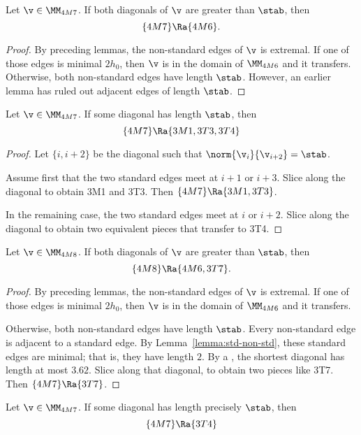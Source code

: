 \begin{lemma}[]
Let $\v\in \MM_{4M7}$.  If both diagonals of $\v$ are greater than $\stab$, then
\[
\{4M7\}\Ra \{4M6\}.
\]
\end{lemma}

\begin{proof}
By preceding lemmas, the non-standard edges of $\v$ is extremal.  If one of those
edges is minimal $2h_0$, then $\v$ is in the domain of $\MM_{4M6}$ and it transfers.
Otherwise, both non-standard edges have length $\stab$.  However, an
earlier lemma has ruled out adjacent edges of length $\stab$.
\end{proof}

\begin{lemma}[]
Let $\v\in \MM_{4M7}$.  If some diagonal has length $\stab$, then
\[
\{4M7\}\Ra \{3M1,3T3,3T4\}
\]
\end{lemma}

\begin{proof} Let $\{i,i+2\}$ be the diagonal such that $\norm{\v_i}{\v_{i+2}} = \stab$.

Assume first that the two standard edges meet at $i+1$ or $i+3$.
Slice along the diagonal to obtain 3M1 and 3T3.  Then $\{4M7\}\Ra\{3M1,3T3\}$.

In the remaining case, the two standard edges meet at $i$ or $i+2$.
Slice along the diagonal to obtain two equivalent pieces that transfer to 3T4.
\end{proof}

\begin{lemma}[]
Let $\v\in \MM_{4M8}$.  If both diagonals of $\v$ are greater than $\stab$, then
\[
\{4M8\}\Ra \{4M6,3T7\}.
\]
\end{lemma}

\begin{proof}
By preceding lemmas, the non-standard edges of $\v$ is extremal.  If one of those
edges is minimal $2h_0$, then $\v$ is in the domain of $\MM_{4M6}$ and it transfers.

Otherwise, both non-standard edges have length $\stab$.  Every non-standard edge
is adjacent to a standard edge.  By Lemma~\ref{lemma:std-non-std}, these standard edges
are minimal; that is, they have length $2$.  By a , the shortest diagonal has length
at most $3.62$.  Slice along that diagonal, to obtain two pieces like 3T7.
Then $\{4M7\}\Ra\{3T7\}$.
\end{proof}

\begin{lemma}[]
Let $\v\in \MM_{4M7}$.  If some diagonal has length precisely $\stab$, then
\[
\{4M7\}\Ra \{3T4\}
\]
\end{lemma}

